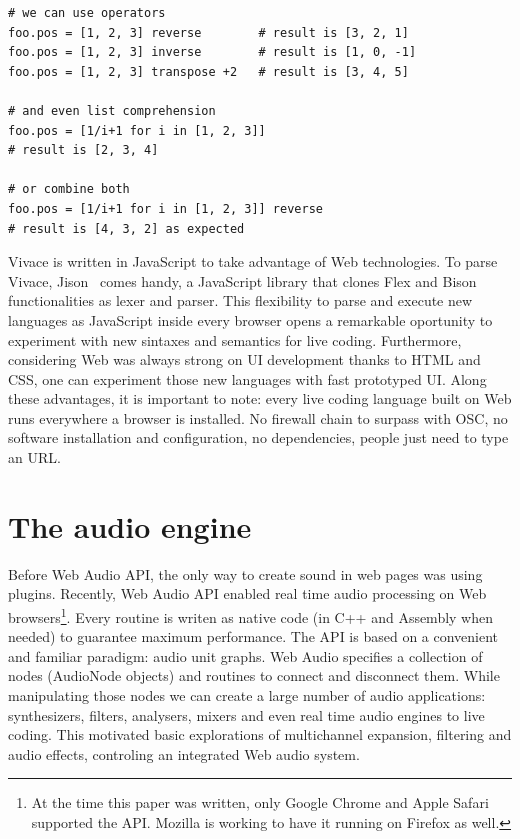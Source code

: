 \documentclass[letterpaper, 12pt]{article}
\begin{document}
\begin{Verbatim}[fontfamily=courier, xleftmargin=\parindent]
# we can use operators
foo.pos = [1, 2, 3] reverse        # result is [3, 2, 1]
foo.pos = [1, 2, 3] inverse        # result is [1, 0, -1]
foo.pos = [1, 2, 3] transpose +2   # result is [3, 4, 5]

# and even list comprehension
foo.pos = [1/i+1 for i in [1, 2, 3]] 
# result is [2, 3, 4]

# or combine both
foo.pos = [1/i+1 for i in [1, 2, 3]] reverse 
# result is [4, 3, 2] as expected
\end{Verbatim}

Vivace is written in JavaScript to take advantage of Web technologies.
To parse Vivace, Jison~\citep*{jison} comes handy, a JavaScript library that
clones Flex and Bison functionalities as lexer and parser. This
flexibility to parse and execute new languages as JavaScript inside
every browser opens a remarkable oportunity to experiment with new
sintaxes and semantics for live coding. Furthermore, considering Web
was always strong on UI development thanks to HTML and CSS, one can
experiment those new languages with fast prototyped UI. Along these
advantages, it is important to note: every live coding
language built on Web runs everywhere a browser is installed. No
firewall chain to surpass with OSC, no software installation and
configuration, no dependencies, people just need to type an URL.

\section{The audio engine}
\label{audioengine}

Before Web Audio API, the only way to create sound in web pages was
using plugins. Recently, Web Audio API enabled real time audio
processing on Web browsers\footnote{At the time this paper was written,
only Google Chrome and Apple Safari supported the API. Mozilla is
working to have it running on Firefox as well.}. Every routine is
writen as native code (in C++ and Assembly when needed) to guarantee
maximum performance. The API is based on a convenient and familiar
paradigm: audio unit graphs. Web Audio specifies a collection of nodes
(AudioNode objects) and routines to connect and disconnect them. While
manipulating those nodes we can create a large number of audio
applications: synthesizers, filters, analysers, mixers and even real
time audio engines to live coding. This motivated basic explorations
of multichannel expansion, filtering and audio effects,
controling an integrated Web audio system.
\end{document}
